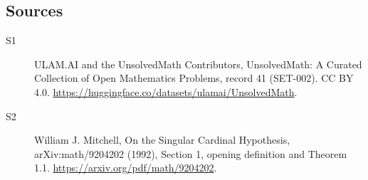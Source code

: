 \documentclass[11pt]{article}
\begin{document}
\subsection{Sources}
\begin{description}
\item[\hypertarget{source:41:1}{S1}] ULAM.AI and the UnsolvedMath Contributors, UnsolvedMath: A Curated Collection of Open Mathematics Problems, record 41 (SET-002). CC BY 4.0. \url{https://huggingface.co/datasets/ulamai/UnsolvedMath}.
\item[\hypertarget{source:41:2}{S2}] William J. Mitchell, On the Singular Cardinal Hypothesis, arXiv:math/9204202 (1992), Section 1, opening definition and Theorem 1.1. \url{https://arxiv.org/pdf/math/9204202}.
\end{description}
\label{end:41}
\end{document}
